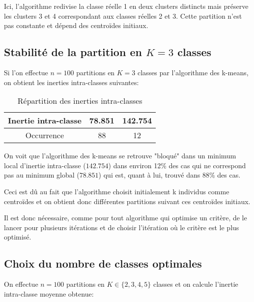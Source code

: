 \documentclass{article}
\begin{document}
\begin{multicols}{2}
Ici, l'algorithme redivise la classe réelle 1 en deux clusters distincts mais
préserve les clusters 3 et 4 correspondant aux classes réelles 2 et 3. Cette
partition n'est pas constante et dépend des centroïdes initiaux.

\subsection{Stabilité de la partition en $K = 3$ classes}\label{subsec:stab}

Si l'on effectue $n = 100$ partitions en $K = 3$ classes par l'algorithme des
k-means, on obtient les inerties intra-classes suivantes:

\begin{table}[H]
    \begin{center}
        \centering
        \captionsetup{justification=centering}
        \caption{\label{tab:inerties}Répartition des inerties intra-classes}
        \begin{tabular}{|c|c|c|}
            \hline
            Inertie intra-classe & 78.851 & 142.754 \\
            \hline
            Occurrence & 88 & 12 \\
            \hline
        \end{tabular}
    \end{center}
\end{table}

On voit que l'algorithme des k-means se retrouve "bloqué" dans un minimum local
d'inertie intra-classe ($142.754$) dans environ 12\% des cas qui ne correspond
pas au minimum global ($78.851$) qui est, quant à lui, trouvé dans 88\% des cas.

Ceci est dû au fait que l'algorithme choisit initialement k individus comme
centroïdes et on obtient donc différentes partitions suivant ces centroïdes
initiaux.

Il est donc nécessaire, comme pour tout algorithme qui optimise un critère, de
le lancer pour plusieurs itérations et de choisir l'itération où le critère est
le plus optimisé.

\subsection{Choix du nombre de classes optimales}\label{subsec:choix}

On effectue $n = 100$ partitions en $K \in \{ 2, 3, 4, 5 \}$ classes et on
calcule l'inertie intra-classe moyenne obtenue:


\end{multicols}
\end{document}
